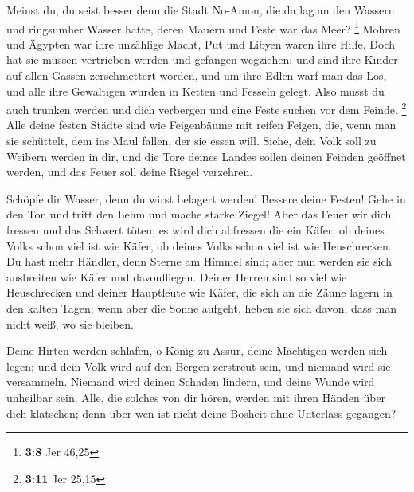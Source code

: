  Meinst du, du seist besser denn die Stadt No-Amon, die da
lag an den Wassern und ringsumher Wasser hatte, deren Mauern und Feste
war das Meer? \footnote{\textbf{3:8} Jer 46,25}  Mohren und
Ägypten war ihre unzählige Macht, Put und Libyen waren ihre Hilfe.
 Doch hat sie müssen vertrieben werden und gefangen
wegziehen; und sind ihre Kinder auf allen Gassen zerschmettert worden,
und um ihre Edlen warf man das Los, und alle ihre Gewaltigen wurden in
Ketten und Fesseln gelegt.  Also musst du auch trunken
werden und dich verbergen und eine Feste suchen vor dem Feinde.
\footnote{\textbf{3:11} Jer 25,15}  Alle deine festen
Städte sind wie Feigenbäume mit reifen Feigen, die, wenn man sie
schüttelt, dem ins Maul fallen, der sie essen will.  Siehe,
dein Volk soll zu Weibern werden in dir, und die Tore deines Landes
sollen deinen Feinden geöffnet werden, und das Feuer soll deine Riegel
verzehren.

 Schöpfe dir Wasser, denn du wirst belagert werden! Bessere
deine Festen! Gehe in den Ton und tritt den Lehm und mache starke
Ziegel!  Aber das Feuer wir dich fressen und das Schwert
töten; es wird dich abfressen die ein Käfer, ob deines Volks schon viel
ist wie Käfer, ob deines Volks schon viel ist wie Heuschrecken.
 Du hast mehr Händler, denn Sterne am Himmel sind; aber nun
werden sie sich ausbreiten wie Käfer und davonfliegen. 
Deiner Herren sind so viel wie Heuschrecken und deiner Hauptleute wie
Käfer, die sich an die Zäune lagern in den kalten Tagen; wenn aber die
Sonne aufgeht, heben sie sich davon, dass man nicht weiß, wo sie
bleiben.

 Deine Hirten werden schlafen, o König zu Assur, deine
Mächtigen werden sich legen; und dein Volk wird auf den Bergen zerstreut
sein, und niemand wird sie versammeln.  Niemand wird deinen
Schaden lindern, und deine Wunde wird unheilbar sein. Alle, die solches
von dir hören, werden mit ihren Händen über dich klatschen; denn über
wen ist nicht deine Bosheit ohne Unterlass gegangen?
